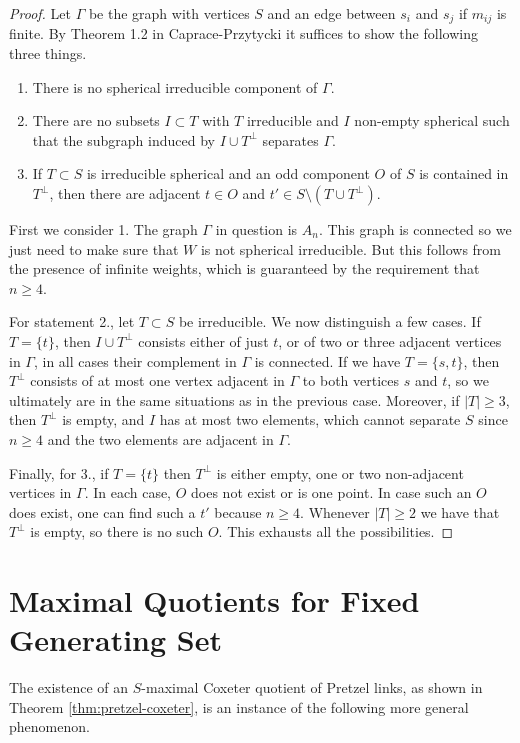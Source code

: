 \documentclass[11pt]{article}
\theoremstyle{definition}
\begin{document}
\begin{proof}
Let $\Gamma$ be the graph with vertices $S$ and an edge between $s_i$ and $s_j$ if $m_{ij}$ is finite. By Theorem 1.2 in Caprace-Przytycki it suffices to show the following three things.
\begin{enumerate}
\item There is no spherical irreducible component of $\Gamma$.
\item  There are no subsets $I \subset T$ with $T$ irreducible and $I$ non-empty spherical such that the subgraph induced by $I \cup T^\perp$ separates $\Gamma$.
\item If $T \subset S$ is irreducible spherical and an odd component $O$ of $S$ is contained in $T^\perp$, then there are adjacent $t\in O$ and $t' \in S\setminus (T \cup T^\perp)$.
\end{enumerate}

First we consider 1. The graph $\Gamma$ in question is $A_n$. This graph is connected so we just need to make sure that $W$ is not spherical irreducible. But this follows from the presence of infinite weights, which is guaranteed by the requirement that $n \geq 4$.

For statement 2., let $T \subset S$ be irreducible. We now distinguish a few cases. If $T = \{t\}$, then $I \cup T^\perp$ consists either of just $t$, or of two or three adjacent vertices in $\Gamma$, in all cases their complement in $\Gamma$ is connected. If we have $T = \{s,t\}$, then $T^\perp$ consists of at most one vertex adjacent in $\Gamma$ to both vertices $s$ and $t$, so we ultimately are in the same situations as in the previous case. Moreover, if $|T| \geq 3$, then $T^\perp$ is empty, and $I$ has at most two elements, which cannot separate $S$ since $n \geq 4$ and the two elements are adjacent in $\Gamma$.

Finally, for 3., if $T = \{t\}$ then $T^\perp$ is either empty, one or two non-adjacent vertices in $\Gamma$. In each case, $O$ does not exist or is one point. In case such an $O$ does exist, one can find such a $t'$ because $n\geq 4$. Whenever $|T| \geq 2$ we have that $T^\perp$ is empty, so there is no such $O$. This exhausts all the possibilities.
\end{proof}

\section{Maximal Quotients for Fixed Generating Set}
The existence of an $S$-maximal Coxeter quotient of Pretzel links, as shown in Theorem \ref{thm:pretzel-coxeter}, is an instance of the following more general phenomenon.
\end{document}
